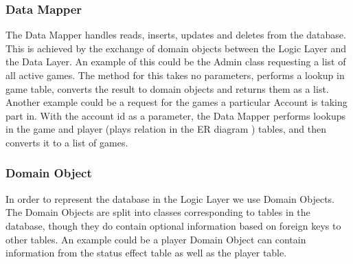 \subsubsection{Data Mapper} \label{sec:dbImplementation}
The Data Mapper handles reads, inserts, updates and deletes from the database. This is achieved by the exchange of domain objects between the Logic Layer and the Data Layer.
An example of this could be the Admin class requesting a list of all active games. The method for this takes no parameters, performs a lookup in game table, converts the result to domain objects and returns them as a list.\\
Another example could be a request for the games a particular Account is taking part in. With the account id as a parameter, the Data Mapper performs lookups in the game and player (plays relation in the ER diagram ) tables, and then converts it to a list of games.


\subsubsection{Domain Object} 
In order to represent the database in the Logic Layer we use Domain Objects. The Domain Objects are split into classes corresponding to tables in the database, though they do contain optional information based on foreign keys to other tables. An example could be a player Domain Object can contain information from the status effect table as well as the player table.
